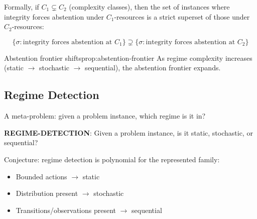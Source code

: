 Formally, if $C_1 \subsetneq C_2$ (complexity classes), then the set of instances where integrity forces abstention under $C_1$-resources is a strict superset of those under $C_2$-resources:

\[
\{\sigma : \text{integrity forces abstention at } C_1\}
\supsetneq
\{\sigma : \text{integrity forces abstention at } C_2\}
\]

\begin{claim}{Abstention frontier shifts}{prop:abstention-frontier}
As regime complexity increases (static $\to$ stochastic $\to$ sequential), the abstention frontier expands.
\end{claim}


\subsection{Regime Detection}

A meta-problem: given a problem instance, which regime is it in?

\begin{decision}\label{dec:regime-detection}
\textbf{REGIME-DETECTION}: Given a problem instance, is it static, stochastic, or sequential?
\end{decision}

Conjecture: regime detection is polynomial for the represented family:
\begin{itemize}
\item Bounded actions $\to$ static
\item Distribution present $\to$ stochastic  
\item Transitions/observations present $\to$ sequential
\end{itemize}

